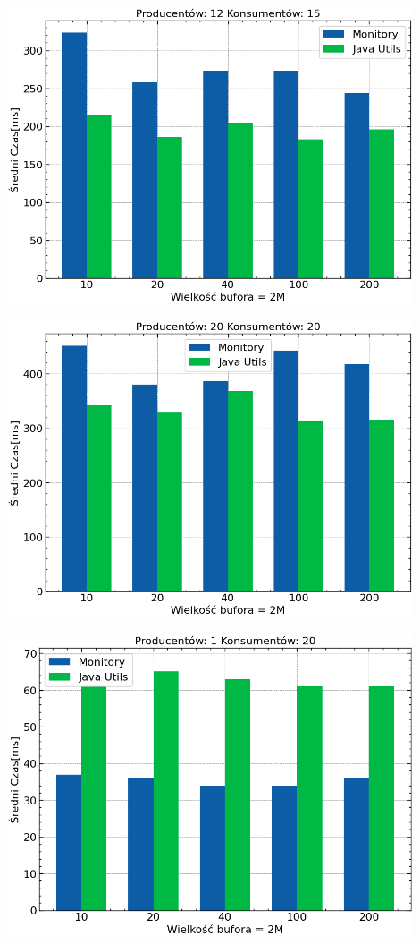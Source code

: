 \documentclass[11pt]{article}
\begin{document}
\begin{center}
\includegraphics[width=12cm]{./m12_n15.png}
\end{center}

\begin{center}
\includegraphics[width=12cm]{./m20_n20.png}
\end{center}

\begin{center}
\includegraphics[width=12cm]{./m1_n20.png}
\end{center}
\end{document}
